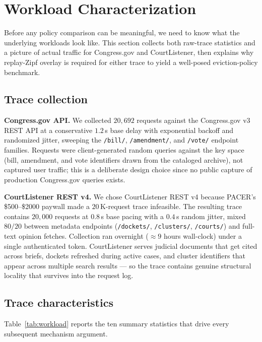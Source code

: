 \section{Workload Characterization}\label{sec:workload}

Before any policy comparison can be meaningful, we need to know what the
underlying workloads look like. This section collects both raw-trace statistics
and a picture of actual traffic for Congress.gov and CourtListener, then
explains why replay-Zipf overlay is required for either trace to yield a
well-posed eviction-policy benchmark.

\subsection*{Trace collection}

\textbf{Congress.gov API.} We collected $20{,}692$ requests against the
Congress.gov v3 REST API at a conservative $1.2\,$s base delay with
exponential backoff and randomized jitter, sweeping the
\texttt{/bill/}, \texttt{/amendment/}, and \texttt{/vote/} endpoint families.
Requests were client-generated random queries against the key space (bill,
amendment, and vote identifiers drawn from the cataloged archive), not captured
user traffic; this is a deliberate design choice since no public capture of
production Congress.gov queries exists.

\textbf{CourtListener REST v4.} We chose CourtListener REST v4 because
PACER's \$500--\$2000 paywall made a $20$\,K-request trace infeasible. The
resulting trace contains $20{,}000$ requests at $0.8\,$s base pacing with a
$0.4\,$s random jitter, mixed $80/20$ between metadata endpoints
(\texttt{/dockets/}, \texttt{/clusters/}, \texttt{/courts/}) and full-text
opinion fetches. Collection ran overnight ($\approx 9$ hours wall-clock) under
a single authenticated token. CourtListener serves judicial documents that
get cited across briefs, dockets refreshed during active cases, and cluster
identifiers that appear across multiple search results --- so the trace
contains genuine structural locality that survives into the request log.

\subsection*{Trace characteristics}

Table~\ref{tab:workload} reports the ten summary statistics that drive every
subsequent mechanism argument.

